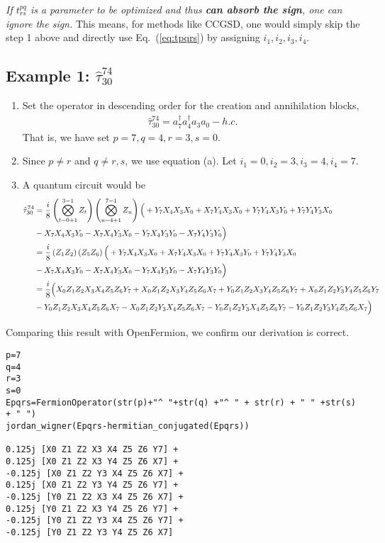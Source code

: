 \documentclass[prb,amsmath,amsfonts,amssymb]{revtex4}
\newcommand{\red}{\color{red}{}}
\newcommand{\black}{\color{black}{}}
\begin{document}
{\it If $t_{rs}^{pq}$ is a parameter to be optimized and thus {\bf can absorb the sign}, one can ignore the sign.} This means, for methods like CCGSD, {\red one would simply skip the step 1 above and directly use Eq.~(\ref{eq:tpqrs}) by assigning $i_1,i_2,i_3,i_4$}. 


\newpage
\subsection{Example 1: $\hat \tau_{30}^{74}$}
\begin{enumerate}
	\item Set the operator in descending order for the creation and annihilation blocks, 
\begin{align}
\hat \tau_{30}^{74} = a_7^\dag a_4^\dag a_3 a_0 - h.c.
\end{align}	
That is, we have set $p = 7, q=4, r = 3, s=0$.
	\item Since $p \ne r$ and $q \ne r, s$, we use equation (a). Let $i_1 = 0, i_2 = 3, i_3 = 4, i_4 = 7$.
	\item A quantum circuit would be
\begin{align}
		\hat \tau_{30}^{74} &= \frac{i }{8} \left(\bigotimes_{t=0+1}^{3-1} Z_t \right) \left(\bigotimes_{u=4+1}^{7-1} Z_u \right) 
 \Bigl(
\black +Y_7 X_4 X_3 X_0 
\black  + X_7 Y_4 X_3 X_0
\black + Y_7 Y_4 X_3  Y_0 
\black+ Y_7 Y_4 Y_3  X_0 \nonumber\\&
\black - X_7 X_4 X_3 Y_0 
\black - X_7 X_4 Y_3 X_0
\black -Y_7  X_4  Y_3 Y_0 
\black- X_7 Y_4 Y_3 Y_0
\black\Bigr)\nonumber\\
&= \frac{i }{8} \left(Z_1Z_2 \right) \left(Z_5Z_6\right) 
 \Bigl(
\black +Y_7 X_4 X_3 X_0 
\black  + X_7 Y_4 X_3 X_0
\black + Y_7 Y_4 X_3  Y_0 
\black+ Y_7 Y_4 Y_3  X_0 \nonumber\\&
\black - X_7 X_4 X_3 Y_0 
\black - X_7 X_4 Y_3 X_0
\black -Y_7  X_4  Y_3 Y_0 
\black- X_7 Y_4 Y_3 Y_0
\black\Bigr)\nonumber\\
&=  \frac{i }{8}  \Bigl(
  X_0 Z_1 Z_2 X_3 X_4 Z_5Z_6Y_7 
+ X_0 Z_1 Z_2 X_3 Y_4 Z_5Z_6X_7 
+ Y_0 Z_1 Z_2 X_3 Y_4 Z_5Z_6Y_7 
+ X_0 Z_1 Z_2 Y_3 Y_4 Z_5Z_6Y_7 \nonumber\\&
- Y_0 Z_1 Z_2 X_3 X_4 Z_5Z_6X_7 
- X_0 Z_1 Z_2 Y_3 X_4 Z_5Z_6X_7 
- Y_0 Z_1 Z_2 Y_3 X_4 Z_5Z_6Y_7
- Y_0 Z_1 Z_2 Y_3 Y_4 Z_5Z_6X_7 
\black\Bigr)\nonumber\\
\end{align}
\end{enumerate}


Comparing this result with OpenFermion, we confirm our derivation is correct.
\begin{Verbatim}[frame=single, xleftmargin=4mm, xrightmargin=10mm]
p=7
q=4 
r=3
s=0 
Epqrs=FermionOperator(str(p)+"^ "+str(q) +"^ " + str(r) + " " +str(s) + " ") 
jordan_wigner(Epqrs-hermitian_conjugated(Epqrs))

0.125j [X0 Z1 Z2 X3 X4 Z5 Z6 Y7] +
0.125j [X0 Z1 Z2 X3 Y4 Z5 Z6 X7] +
-0.125j [X0 Z1 Z2 Y3 X4 Z5 Z6 X7] +
0.125j [X0 Z1 Z2 Y3 Y4 Z5 Z6 Y7] +
-0.125j [Y0 Z1 Z2 X3 X4 Z5 Z6 X7] +
0.125j [Y0 Z1 Z2 X3 Y4 Z5 Z6 Y7] +
-0.125j [Y0 Z1 Z2 Y3 X4 Z5 Z6 Y7] +
-0.125j [Y0 Z1 Z2 Y3 Y4 Z5 Z6 X7]
\end{Verbatim}
\end{document}
